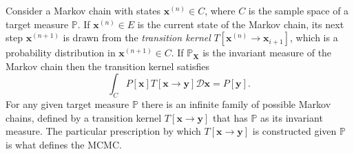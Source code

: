 Consider a Markov chain with states $\mathbf{x}^{(n)} \in C$, where $C$ is the sample space of a target measure $\mathbb{P}$. If $\mathbf{x}^{(n)} \in E$ is the current state of the Markov chain, its next step $\mathbf{x}^{(n+1)}$ is drawn from the \textit{transition kernel} $T[\mathbf{x}^{(n)} \to \mathbf{x}_{i+1}]$, which is a probability distribution in $\mathbf{x}^{(n+1)} \in C$. If $\mathbb{P}_\mathbf{X}$ is the invariant measure of the Markov chain then the transition kernel satisfies
\begin{equation} \label{eq:P_X invariant measure T}
	\int_C P[\mathbf{x}] T[\mathbf{x} \to \mathbf{y}] \mathcal{D} \mathbf{x} = P[\mathbf{y}].
\end{equation}
For any given target measure $\mathbb{P}$ there is an infinite family of possible Markov chains, defined by a transition kernel $T[\mathbf{x} \to \mathbf{y}]$ that has $\mathbb{P}$ as its invariant measure. The particular prescription by which $T[\mathbf{x} \to \mathbf{y}]$ is constructed given $\mathbb{P}$ is what defines the MCMC.

